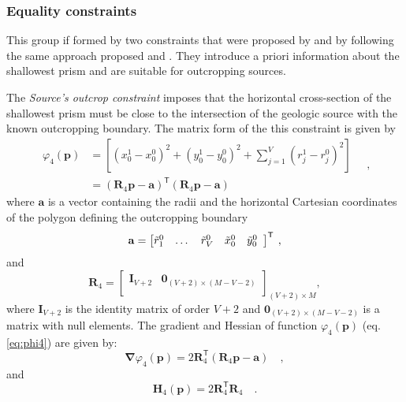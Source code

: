 \subsubsection{Equality constraints}

This group if formed by two constraints that were proposed by \cite{oliveirajr-etal2011} and \cite{oliveirajr-barbosa2013} by following the same approach proposed \cite{barbosa-etal1997} and 
\cite{barbosa-etal1999}. They introduce a priori information about the shallowest prism and are  suitable for outcropping sources.

The \textit{Source’s outcrop constraint} imposes that the horizontal cross-section of the shallowest prism 
must be close to the intersection of the geologic source with the known outcropping boundary. 
The matrix form of the this constraint is given by
\begin{equation}\label{eq:phi4}
\begin{split}
\varphi_{4}(\mathbf{p}) &= \left[\left(x_{0}^{1} - x_{0}^{0}\right)^2 + \left(y_{0}^{1} - y_{0}^{0}\right)^2 + \sum\limits^{V}_{j=1}\left(r^{1}_{j}-r^{0}_{j}\right)^2\right] \\
&= \left(\mathbf{R}_{4} \mathbf{p} - \mathbf{a} \right)^{\mathsf{T}} 
\left(\mathbf{R}_{4} \mathbf{p} - \mathbf{a} \right)
\end{split} \quad ,
\end{equation}
where $\mathbf{a}$ is a vector containing the radii and the horizontal Cartesian coordinates of the 
polygon defining the outcropping boundary
\begin{equation}
\mathbf{a} = \left[ \begin{array}{@{}*{12}{c}@{}}
\tilde{r}_{1}^{0} & \dots & \tilde{r}_{V}^{0} & \tilde{x}_{0}^{0} & \tilde{y}_{0}^{0} \\
\end{array} \right]^{\mathsf{T}} \: ,
\label{eq:a-vector}
\end{equation}
and
\begin{equation}
\mathbf{R}_{4} = 
\begin{bmatrix}
\mathbf{I}_{V+2} & \mathbf{0}_{(V+2) \times (M-V-2)} \\
\end{bmatrix}_{(V+2)\times M},
\label{eq:R4-matrix}
\end{equation}
where $\mathbf{I}_{V+2}$ is the identity matrix of order $V+2$ and $\mathbf{0}_{(V+2) \times (M-V-2)}$ is a matrix 
with null elements. The gradient and Hessian of function $\varphi_{4}(\mathbf{p})$ (eq. \ref{eq:phi4}) are given by:
\begin{equation}\label{eq:phi4_grad}
\boldsymbol{\nabla}\varphi_{4}(\mathbf{p}) = 2 \mathbf{R}_{4}^{\mathsf{T}} 
\left(\mathbf{R}_{4} \mathbf{p} - \mathbf{a} \right) \quad ,
\end{equation}
and
\begin{equation}\label{eq:phi4_hessian}
\mathbf{H}_{4}(\mathbf{p}) = 2 \mathbf{R}^{\mathsf{T}}_{4}\mathbf{R}_{4} \quad .
\end{equation}

